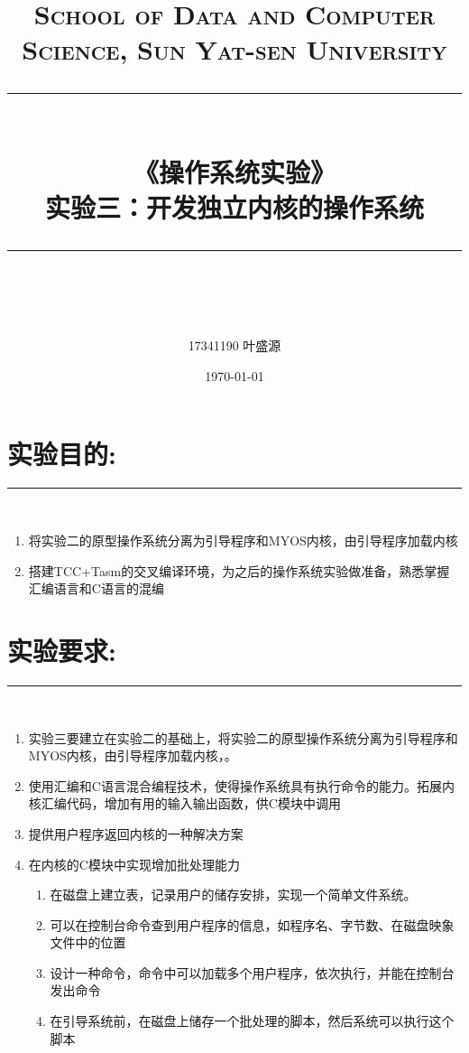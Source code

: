 \documentclass[UTF8]{article}
\title{	
\normalfont \normalsize
\textsc{School of Data and Computer Science, Sun Yat-sen University} \\ [25pt] %
\rule{\textwidth}{0.5pt} \\[0.4cm] %
{\LARGE\heiti\bfseries  《操作系统实验》}\\[0.5cm] %
{\huge\bfseries\heiti 实验三：开发独立内核的操作系统} \\
\rule{\textwidth}{2pt} \\[0.5cm] %
\author{\Large17341190 叶盛源}
\date{\normalsize\today}
}
\begin{document}
\maketitle
\tableofcontents
\newpage
	

\section{实验目的:}
\noindent\rule[0.2\baselineskip]{\textwidth}{0.5pt}\\[-23pt]
\begin{enumerate}[1)]
	\heiti
	\item 将实验二的原型操作系统分离为引导程序和MYOS内核，由引导程序加载内核
	\item 搭建TCC+Tasm的交叉编译环境，为之后的操作系统实验做准备，熟悉掌握汇编语言和C语言的混编
\end{enumerate}

\section{实验要求:}
\noindent\rule[0.2\baselineskip]{\textwidth}{0.5pt}\\[-23pt]
\begin{enumerate}[1)]
	\setlength{\itemsep}{0.2ex}
	\heiti
	\item 实验三要建立在实验二的基础上，将实验二的原型操作系统分离为引导程序和MYOS内核，由引导程序加载内核，{\color{red}。}
	\item 使用汇编和C语言混合编程技术，使得操作系统具有执行命令的能力。拓展内核汇编代码，增加有用的输入输出函数，供C模块中调用 
	\item 提供用户程序返回内核的一种解决方案
	\item 在内核的C模块中实现增加批处理能力
	\vspace{-0.2cm}
		\begin{enumerate}[i]
		\setlength{\itemsep}{0ex}
			\item 在磁盘上建立表，记录用户的储存安排，实现一个简单文件系统。
			\item 可以在控制台命令查到用户程序的信息，如程序名、字节数、在磁盘映象文件中的位置
			\item 设计一种命令，命令中可以加载多个用户程序，依次执行，并能在控制台发出命令
			\item 在引导系统前，在磁盘上储存一个批处理的脚本，然后系统可以执行这个脚本
		\end{enumerate}
\end{enumerate}
\end{document}
